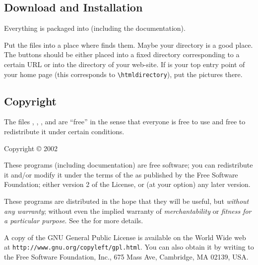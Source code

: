 \subsection{Download and Installation}

Everything is packaged into
 (including the
documentation).

Put the  files into a place where \HLX{} finds them. Maybe
your directory  is a good place.
%
The buttons should be either placed into a fixed directory
corresponding to a certain URL or into the directory of your web-site.
If  is your top entry point of your home page
(this corresponds to \verb'\htmldirectory'), put the pictures there.













\subsection{Copyright}

The files , ,
, and  are ``free'' in the sense
that everyone is free to use and free to redistribute it under certain
conditions. 

Copyright \copyright{} 2002 

These programs (including documentation) are free software; you can
redistribute it and/or modify it under the terms of the  as
published by the Free Software Foundation; either version 2 of the
License, or (at your option) any later version.

These programs are distributed in the hope that they will be useful,
but \emph{without any warranty}; without even the implied warranty of
\emph{merchantability} or \emph{fitness for a particular purpose}.
%
See the
%
%
for more details.
\begin{iftex}
  A copy of the GNU General Public License is available on
  the World Wide web at \texttt{http://www.gnu.org/copyleft/gpl.html}.
%
  You can also obtain it by writing to the Free Software Foundation,
  Inc., 675 Mass Ave, Cambridge, MA 02139, USA.
\end{iftex}












